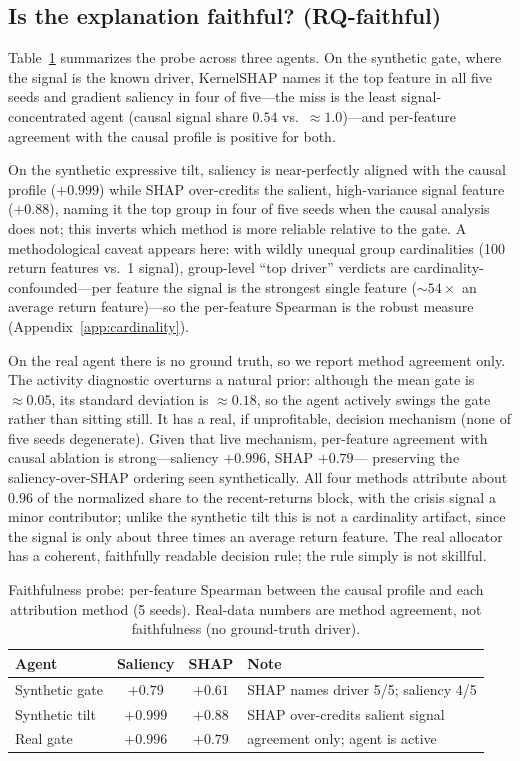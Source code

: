 \documentclass[sigconf,anonymous,review]{acmart}
\begin{document}
\subsection{Is the explanation faithful? (RQ-faithful)}
Table~\ref{tab:rq3} summarizes the probe across three agents. On the synthetic gate,
where the signal is the known driver, KernelSHAP names it the top feature in all five
seeds and gradient saliency in four of five---the miss is the least
signal-concentrated agent (causal signal share $0.54$ vs.\ $\approx1.0$)---and
per-feature agreement with the causal profile is positive for both.

On the synthetic expressive tilt, saliency is near-perfectly aligned with the causal
profile ($+0.999$) while SHAP over-credits the salient, high-variance signal feature
($+0.88$), naming it the top group in four of five seeds when the causal analysis
does not; this inverts which method is more reliable relative to the gate. A
methodological caveat appears here: with wildly unequal group cardinalities (100
return features vs.\ 1 signal), group-level ``top driver'' verdicts are
cardinality-confounded---per feature the signal is the strongest single feature
($\sim54\times$ an average return feature)---so the per-feature Spearman is the robust
measure (Appendix~\ref{app:cardinality}).

On the real agent there is no ground truth, so we report method agreement only. The
activity diagnostic overturns a natural prior: although the mean gate is
$\approx0.05$, its standard deviation is $\approx0.18$, so the agent actively swings
the gate rather than sitting still. It has a real, if unprofitable, decision
mechanism (none of five seeds degenerate). Given that live mechanism, per-feature
agreement with causal ablation is strong---saliency $+0.996$, SHAP $+0.79$---
preserving the saliency-over-SHAP ordering seen synthetically. All four methods
attribute about $0.96$ of the normalized share to the recent-returns block, with the
crisis signal a minor contributor; unlike the synthetic tilt this is not a
cardinality artifact, since the signal is only about three times an average return
feature. The real allocator has a coherent, faithfully readable decision rule; the
rule simply is not skillful.

\begin{table}[t]
  \caption{Faithfulness probe: per-feature Spearman between the causal profile and
  each attribution method (5 seeds). Real-data numbers are method agreement, not
  faithfulness (no ground-truth driver).}
  \label{tab:rq3}
  \small
  \begin{tabular}{lccl}
    \toprule
    Agent & Saliency & SHAP & Note\\
    \midrule
    Synthetic gate & $+0.79$ & $+0.61$ & SHAP names driver 5/5; saliency 4/5\\
    Synthetic tilt & $+0.999$ & $+0.88$ & SHAP over-credits salient signal\\
    Real gate      & $+0.996$ & $+0.79$ & agreement only; agent is active\\
    \bottomrule
  \end{tabular}
\end{table}
\end{document}
